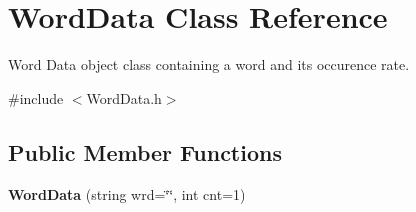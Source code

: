 \hypertarget{classWordData}{\section{Word\-Data Class Reference}
\label{classWordData}
}


Word Data object class containing a word and its occurence rate.  




{\ttfamily \#include $<$Word\-Data.\-h$>$}

\subsection*{Public Member Functions}
\begin{DoxyCompactItemize}
\item 
\hypertarget{classWordData_a5b4a15f68dedff06dccfa3ac69a4a144}{{\bfseries Word\-Data} (string wrd=\char`\"{}\char`\"{}, int cnt=1)}\label{classWordData_a5b4a15f68dedff06dccfa3ac69a4a144}


\end{DoxyCompactItemize}
